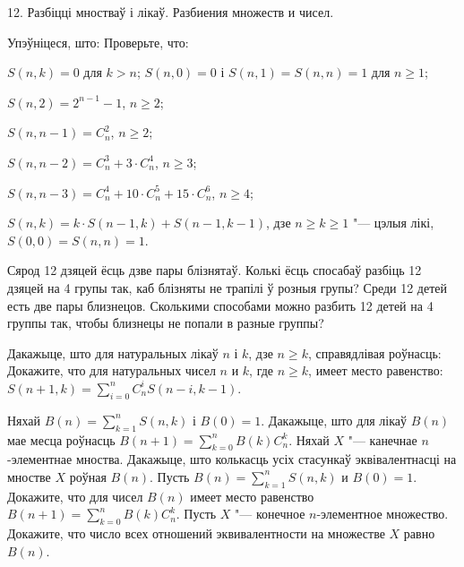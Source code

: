 



\biLangHeader
{12. Разбіцці мностваў і лікаў.}
{Разбиения множеств и чисел.}

\begin{problemList}

\problemItemWithCommonPart
{Упэўніцеся, што:}
{Проверьте, что:}
{%
\begin{belarusianEnumerate}
  \item $S(n, k) = 0$ для $k > n$; $S(n, 0) = 0$ і $S(n, 1) = S(n, n) = 1$ для $n \ge 1$;
  \item $S(n, 2) = 2^{n - 1} - 1$, $n \ge 2$;
  \item $S(n, n - 1) = C_n^2$, $n \ge 2$;
  \item $S(n, n - 2) = C_n^3 + 3 \cdot C_n^4$, $n \ge 3$;
  \item $S(n, n - 3) = C_n^4 + 10 \cdot C_n^5 + 15 \cdot C_n^6$, $n \ge 4$;
  \item $S(n, k) = k \cdot S(n - 1, k) + S(n - 1, k - 1)$, дзе $n \ge k \ge 1$ "--- цэлыя лікі,
  $S(0, 0) = S(n, n) = 1$.
\end{belarusianEnumerate}
}

\smallskip

\problemItemSimple
{Сярод 12 дзяцей ёсць дзве пары блізнятаў. Колькі ёсць спосабаў разбіць 12 дзяцей
на 4 групы так, каб блізняты не трапілі ў розныя групы?}
{Среди 12 детей есть две пары близнецов. Сколькими способами можно разбить
12 детей на 4 группы так, чтобы близнецы не попали в разные группы?}

\bigskip

\problemItemWithCommonPart
{Дакажыце, што для натуральных лікаў $n$ і $k$, дзе $n \ge k$,
справядлівая роўнасць:}
{Докажите, что для натуральных чисел $n$ и $k$, где $n \ge k$,
имеет место равенство:}
{$S(n + 1, k) = \sum\limits_{i = 0}^n C_n^i S(n - i, k - 1)$.}

\bigskip

\problemItemSimple
{Няхай $B(n) = \sum\limits_{k = 1}^n S(n, k)$ і $B(0) = 1$. Дакажыце,
што для лікаў $B(n)$ мае месца роўнасць $B(n + 1) = \sum\limits_{k = 0}^n B(k)C_n^k$.
Няхай $X$ "--- канечнае $n$-элементнае мноства. Дакажыце, што колькасць усіх
стасункаў эквівалентнасці на мностве $X$ роўная $B(n)$.}
{Пусть $B(n) = \sum\limits_{k = 1}^n S(n, k)$ и $B(0) = 1$. Докажите,
что для чисел $B(n)$ имеет место равенство $B(n + 1) = \sum\limits_{k = 0}^n B(k)C_n^k$.
Пусть $X$ "--- конечное $n$-элементное множество. Докажите, что число всех
отношений эквивалентности на множестве $X$ равно $B(n)$.}


\end{problemList}
